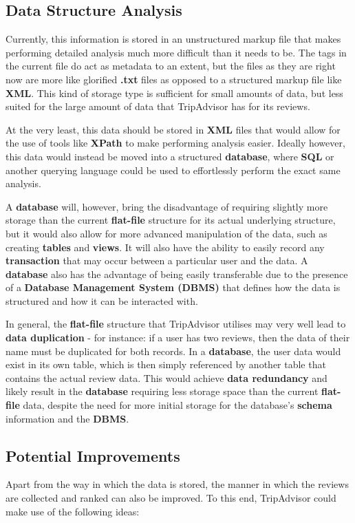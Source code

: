 \documentclass{article}
\begin{document}
	
	\subsection{Data Structure Analysis}
	Currently, this information is stored in an unstructured markup file that makes performing detailed analysis much more difficult than it needs to be. The tags in the current file do act as metadata to an extent, but the files as they are right now are more like glorified \textbf{.txt} files as opposed to a structured markup file like \textbf{XML}. This kind of storage type is sufficient for small amounts of data, but less suited for the large amount of data that TripAdvisor has for its reviews. 
	
	At the very least, this data should be stored in \textbf{XML} files that would allow for the use of tools like \textbf{XPath} to make performing analysis easier. Ideally however, this data would instead be moved into a structured \textbf{database}, where \textbf{SQL} or another querying language could be used to effortlessly perform the exact same analysis.
	
	A \textbf{database} will, however, bring the disadvantage of requiring slightly more storage than the current \textbf{flat-file} structure for its actual underlying structure, but it would also allow for more advanced manipulation of the data, such as creating \textbf{tables} and \textbf{views}. It will also have the ability to easily record any \textbf{transaction} that may occur between a particular user and the data. A \textbf{database} also has the advantage of being easily transferable due to the presence of a \textbf{Database Management System (DBMS)} that defines how the data is structured and how it can be interacted with.
	
	In general, the \textbf{flat-file} structure that TripAdvisor utilises may very well lead to \textbf{data duplication} - for instance: if a user has two reviews, then the data of their name must be duplicated for both records. In a \textbf{database}, the user data would exist in its own table, which is then simply referenced by another table that contains the actual review data. This would achieve \textbf{data redundancy} and likely result in the \textbf{database} requiring less storage space than the current \textbf{flat-file} data, despite the need for more initial storage for the database's \textbf{schema} information and the \textbf{DBMS}.
	
	\newpage
	\subsection{Potential Improvements}
	Apart from the way in which the data is stored, the manner in which the reviews are collected and ranked can also be improved. To this end, TripAdvisor could make use of the following ideas:
	
\end{document}
